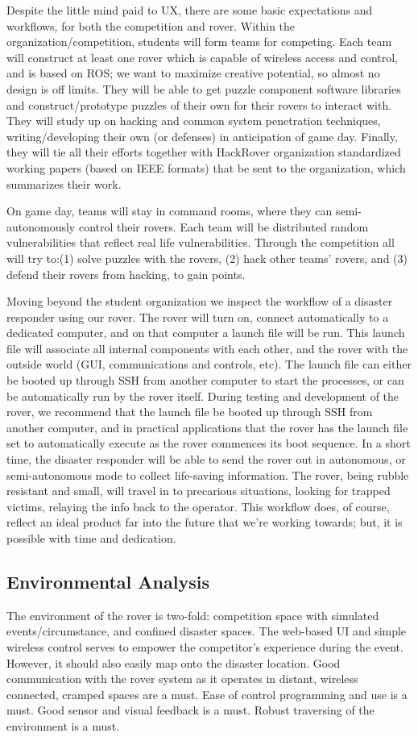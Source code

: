 \documentclass[a4paper, 10pt]{article}
\begin{document}
	Despite the little mind paid to UX, there are some basic expectations and workflows, for both the competition and rover. Within the organization/competition, students will form teams for competing. Each team will construct at least one rover which is capable of wireless access and control, and is based on ROS; we want to maximize creative potential, so almost no design is off limits. They will be able to get puzzle component software libraries and construct/prototype puzzles of their own for their rovers to interact with. They will study up on hacking and common system penetration techniques, writing/developing their own (or defenses) in anticipation of game day. Finally, they will tie all their efforts together with HackRover organization standardized working papers (based on IEEE formats) that be sent to the organization, which summarizes their work.
	
	On game day, teams will stay in command rooms, where they can semi-autonomously control their rovers. Each team will be distributed random vulnerabilities that reflect real life vulnerabilities. Through the competition all will try to:(1) solve puzzles with the rovers, (2) hack other teams' rovers, and (3) defend their rovers from hacking, to gain points.
	
	Moving beyond the student organization we inspect the workflow of a disaster responder using our rover. The rover will turn on, connect automatically to a dedicated computer, and on that computer a launch file will be run. This launch file will associate all internal components with each other, and the rover with the outside world (GUI, communications and controls, etc). The launch file can either be booted up through SSH from another computer to start the processes, or can be automatically run by the rover itself. During testing and development of the rover, we recommend that the launch file be booted up through SSH from another computer, and in practical applications that the rover has the launch file set to automatically execute as the rover commences its boot sequence. In a short time, the disaster responder will be able to send the rover out in autonomous, or semi-autonomous mode to collect life-saving information. The rover, being rubble resistant and small, will travel in to precarious situations, looking for trapped victims, relaying the info back to the operator. This workflow does, of course, reflect an ideal product far into the future that we're working towards; but, it is possible with time and dedication. 

	\subsection{Environmental Analysis}
	The environment of the rover is two-fold: competition space with simulated events/circumstance, and confined disaster spaces. The web-based UI and simple wireless control serves to empower the competitor's experience during the event. However, it should also easily map onto the disaster location. Good communication with the rover system as it operates in distant, wireless connected, cramped spaces are a must. Ease of control programming and use is a must. Good sensor and visual feedback is a must. Robust traversing of the environment is a must. 
	
\end{document}

